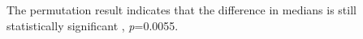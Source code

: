 \documentclass[
]{article}
\newenvironment{Shaded}{\begin{snugshade}}{\end{snugshade}}
\newcommand{\DecValTok}[1]{\textcolor[rgb]{0.00,0.00,0.81}{#1}}
\newcommand{\FloatTok}[1]{\textcolor[rgb]{0.00,0.00,0.81}{#1}}
\newcommand{\FunctionTok}[1]{\textcolor[rgb]{0.00,0.00,0.00}{#1}}
\newcommand{\NormalTok}[1]{#1}
\newcommand{\OtherTok}[1]{\textcolor[rgb]{0.56,0.35,0.01}{#1}}
\newcommand{\SpecialCharTok}[1]{\textcolor[rgb]{0.00,0.00,0.00}{#1}}
\begin{document}
\begin{Shaded}
\end{Shaded}

The permutation result indicates that the difference in medians is still
statistically significant , \emph{p}=0.0055.
\end{document}
